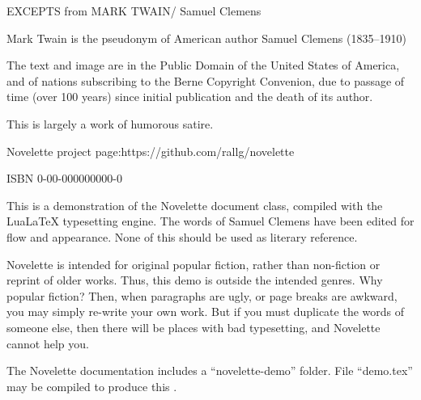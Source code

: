 \documentclass[../demo.tex]{novelettesubdoc}
\begin{document}
\begin{fullpage} %
\null\null\null\null\null %
\null\null\null %
\vfill %
\end{fullpage}

\begin{copyrightpage}
\vfill %
EXCEPTS from MARK TWAIN\br/ Samuel Clemens\par
Mark Twain is the pseudonym of American\br
author Samuel Clemens (1835--1910)\par
The text and image are in the Public Domain\br
of the United States of America, and of nations\br
subscribing to the Berne Copyright Convenion,\br
due to passage of time (over 100 years) since\br
initial publication and the death of its author.\par
This is largely a work of humorous satire.\par
Novelette project page:\br https://github.com/rallg/novelette\par
ISBN 0-00-000000000-0\par
\end{copyrightpage}


\begin{fullpage} %
\begin{upperpage}
\null\null\null\null %
\null\null %
\end{upperpage}
\begin{blockindent}[2,2]
This is a demonstration of the Novelette document
class, compiled with the LuaLaTeX typesetting engine.
The words of Samuel Clemens have been edited for flow and appearance.
None of this should be used as literary reference.\par
\forceindent Novelette is intended for original popular fiction, rather than
non-fiction or reprint of older works. Thus, this demo is outside the intended
genres. Why  popular fiction? Then, when paragraphs are ugly,
or page breaks are awkward, you may simply re-write your own work.
But if you must duplicate the words of someone else, then there will be places
with bad typesetting, and Novelette cannot help you.\par 
\forceindent The Novelette documentation includes a ``novelette-demo'' folder.
File ``demo.tex'' may be compiled to produce this .\par
\end{blockindent}
\end{fullpage}


\blankpage %
\end{document}
